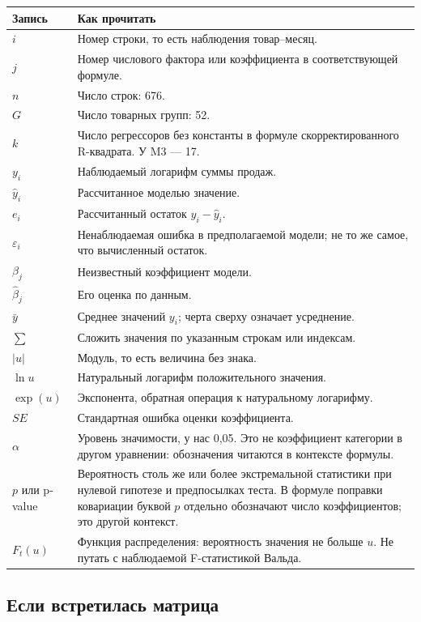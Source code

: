 \documentclass[12pt,a4paper]{article}
\begin{document}
\begin{longtable}{p{}p{}}
\toprule Запись & Как прочитать\\\midrule\endhead
$i$ & Номер строки, то есть наблюдения товар--месяц.\\
$j$ & Номер числового фактора или коэффициента в соответствующей формуле.\\
$n$ & Число строк: 676.\\
$G$ & Число товарных групп: 52.\\
$k$ & Число регрессоров без константы в формуле скорректированного R-квадрата. У M3 --- 17.\\
$y_i$ & Наблюдаемый логарифм суммы продаж.\\
$\widehat y_i$ & Рассчитанное моделью значение.\\
$e_i$ & Рассчитанный остаток $y_i-\widehat y_i$.\\
$\varepsilon_i$ & Ненаблюдаемая ошибка в предполагаемой модели; не то же самое, что вычисленный остаток.\\
$\beta_j$ & Неизвестный коэффициент модели.\\
$\widehat\beta_j$ & Его оценка по данным.\\
$\bar y$ & Среднее значений $y_i$; черта сверху означает усреднение.\\
$\sum$ & Сложить значения по указанным строкам или индексам.\\
$|u|$ & Модуль, то есть величина без знака.\\
$\ln u$ & Натуральный логарифм положительного значения.\\
$\exp(u)$ & Экспонента, обратная операция к натуральному логарифму.\\
$SE$ & Стандартная ошибка оценки коэффициента.\\
$\alpha$ & Уровень значимости, у нас 0,05. Это не коэффициент категории в другом уравнении: обозначения читаются в контексте формулы.\\
$p$ или p-value & Вероятность столь же или более экстремальной статистики при нулевой гипотезе и предпосылках теста. В формуле поправки ковариации буквой $p$ отдельно обозначают число коэффициентов; это другой контекст.\\
$F_t(u)$ & Функция распределения: вероятность значения не больше $u$. Не путать с наблюдаемой F-статистикой Вальда.\\
\bottomrule\end{longtable}

\subsection*{Если встретилась матрица}
\end{document}

